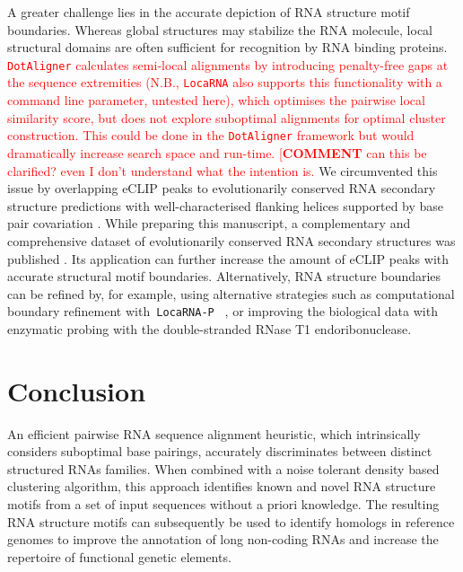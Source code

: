 \documentclass{bmcart}
\newcommand\dotaligner{\texttt{DotAligner}}
\newcommand\locarna{\texttt{LocaRNA}}
\begin{document}
A greater challenge lies in the accurate depiction of RNA structure motif boundaries. 
Whereas global structures may stabilize the RNA molecule, local
structural domains are often sufficient for recognition by RNA binding
proteins.
\textcolor{red}{ 
 \dotaligner{} calculates semi-local alignments by introducing penalty-free gaps 
at the sequence extremities (N.B.,  \locarna{} also supports this functionality with a 
command line parameter, untested here), which optimises the pairwise local 
similarity score, but does not explore suboptimal alignments for optimal cluster construction.
 This could be done in the \dotaligner{} framework but would dramatically increase search
space and run-time. [\textbf{COMMENT} can this be clarified? even I don't understand what the intention is. }
	We circumvented this issue by overlapping eCLIP peaks to 
evolutionarily conserved RNA secondary structure predictions with well-characterised
flanking helices supported by base pair covariation \cite{smith2013widespread}.
While preparing this manuscript, a complementary and comprehensive dataset 
of evolutionarily conserved RNA secondary structures was published \cite{seemann2017identification}. Its application can further increase the amount of eCLIP peaks with accurate structural motif boundaries. 
Alternatively, RNA structure boundaries can be refined by, for example, 
using alternative strategies such as computational boundary refinement 
with\texttt{ LocaRNA-P } \cite{will2012locarna}, or improving the biological 
data with enzymatic probing with the double-stranded RNase T1 
endoribonuclease. \\


\section*{Conclusion}
An efficient pairwise RNA sequence alignment heuristic, which intrinsically considers
suboptimal base pairings, accurately discriminates between distinct structured RNAs families.
When combined with a noise tolerant density based clustering algorithm, this 
approach identifies known and novel RNA structure motifs from a set of input sequences 
without a priori knowledge. The resulting RNA structure motifs can subsequently 
be used to identify homologs in reference genomes to improve the annotation of 
long non-coding RNAs and increase the repertoire of functional genetic elements. 


\end{document}
